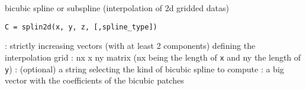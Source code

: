 
\begin{mandesc}
   {bicubic spline or subspline (interpolation of 2d
    gridded datas)}
\end{mandesc}

\begin{calling_sequence}
\begin{verbatim}
C = splin2d(x, y, z, [,spline_type])
\end{verbatim}
\end{calling_sequence}

\begin{parameters}
  \begin{varlist}
   : strictly increasing vectors (with at least 2 components)
               defining the interpolation grid
   : nx x ny matrix (nx being the length of \verb!x! and 
               ny the length of \verb!y!)
   : (optional) a string selecting the kind of bicubic spline to compute
   : a big vector with the coefficients of the bicubic patches
  \end{varlist}
\end{parameters}

